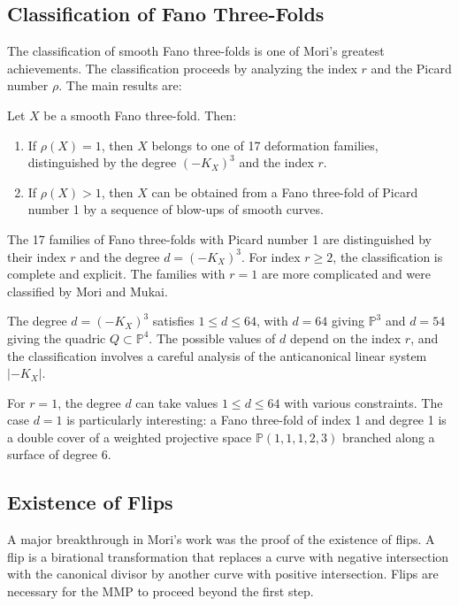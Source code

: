 \subsection*{Classification of Fano Three-Folds}

The classification of smooth Fano three-folds is one of Mori's greatest
achievements. The classification proceeds by analyzing the index $r$ and the
Picard number $\rho$. The main results are:

\begin{theorem}
Let $X$ be a smooth Fano three-fold. Then:
\begin{enumerate}
    \item If $\rho(X) = 1$, then $X$ belongs to one of 17 deformation families,
    distinguished by the degree $(-K_X)^3$ and the index $r$.
    \item If $\rho(X) > 1$, then $X$ can be obtained from a Fano three-fold
    of Picard number 1 by a sequence of blow-ups of smooth curves.
\end{enumerate}
\end{theorem}

The 17 families of Fano three-folds with Picard number 1 are distinguished by
their index $r$ and the degree $d = (-K_X)^3$. For index $r \geq 2$, the
classification is complete and explicit. The families with $r = 1$ are more
complicated and were classified by Mori and Mukai.

The degree $d = (-K_X)^3$ satisfies $1 \leq d \leq 64$, with $d = 64$ giving
$\mathbb{P}^3$ and $d = 54$ giving the quadric $Q \subset \mathbb{P}^4$. The
possible values of $d$ depend on the index $r$, and the classification involves
a careful analysis of the anticanonical linear system $|-K_X|$.

For $r = 1$, the degree $d$ can take values $1 \leq d \leq 64$ with various
constraints. The case $d = 1$ is particularly interesting: a Fano three-fold
of index 1 and degree 1 is a double cover of a weighted projective space
$\mathbb{P}(1,1,1,2,3)$ branched along a surface of degree 6.

\subsection*{Existence of Flips}

A major breakthrough in Mori's work was the proof of the existence of flips.
A flip is a birational transformation that replaces a curve with negative
intersection with the canonical divisor by another curve with positive
intersection. Flips are necessary for the MMP to proceed beyond the first step.

